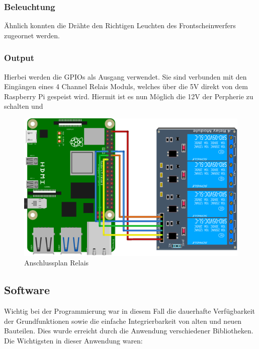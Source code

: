 \newpage

\subsubsection{Beleuchtung}

Ähnlich konnten die Drähte den Richtigen Leuchten des Frontscheinwerfers zugeornet werden.

\newpage

\subsubsection{Output}

Hierbei werden die GPIOs als Ausgang verwendet. Sie sind verbunden mit den Eingängen eines 4 Channel Relais Moduls, welches über die 5V direkt von dem Raspberry Pi gespeist wird. Hiermit ist es nun Möglich die 12V der Perpherie zu schalten und 

\begin{figure}[H]
	\begin{center}
		\includegraphics[scale=0.7]{figures/hcis/4ch_relai.png}
			\caption{Anschlussplan Relais}
			\label{fig:output}
	\end{center}
\end{figure}


\subsection{Software}

Wichtig bei der Programmierung war in diesem Fall die dauerhafte Verfügbarkeit der Grundfunktionen  sowie die einfache Integrierbarkeit von alten und neuen Bauteilen. Dies wurde erreicht durch die Anwendung verschiedener Bibliotheken.\\
Die Wichtigsten in dieser Anwendung waren: \\

